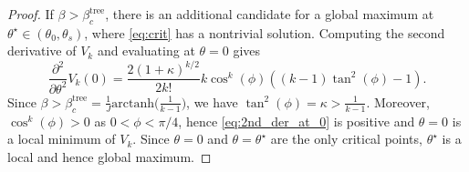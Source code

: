 \documentclass[10pt,a4paper]{amsart}
\begin{document}
\begin{proof}
  If $\beta > \beta_c^\mathrm{tree}$, there is an additional candidate 
  for a global maximum at $\theta^\star \in (\theta_0,\theta_s)$, where \eqref{eq:crit} has a nontrivial solution.
  Computing the second derivative of $V_k$ and evaluating at $\theta=0$ gives
  \begin{equation}
      \label{eq:2nd_der_at_0}
      \frac{\partial^2}{\partial \theta^2} V_k(0) = \frac{2(1+\kappa)^{k/2}}{2 k!} k \cos^k(\phi) \left( (k-1) \tan^2(\phi) - 1 \right).
  \end{equation}
  Since $\beta > \beta_c^{\text{tree}} = \frac{1}{J}\mathrm{arctanh} \big(\tfrac{1}{k-1}\big)$, we have $\tan^2(\phi) = \kappa > \frac{1}{k-1}$. Moreover, $\cos^k(\phi) > 0$ as $0<\phi<\pi/4$, hence \eqref{eq:2nd_der_at_0} is positive and $\theta=0$ is a local minimum of $V_k$. Since $\theta=0$ and $\theta=\theta^\star$ are the only critical points, $\theta^\star$ is a local and hence global maximum.
\end{proof}
\end{document}
